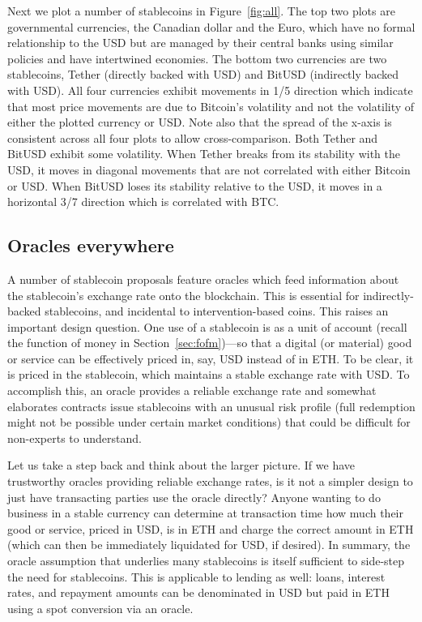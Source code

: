 Next we plot a number of stablecoins in Figure~\ref{fig:all}. The top two plots are governmental currencies, the Canadian dollar and the Euro, which have no formal relationship to the USD but are managed by their central banks using similar policies and have intertwined economies. The bottom two currencies are two stablecoins, Tether (directly backed with USD) and BitUSD (indirectly backed with USD). All four currencies exhibit movements in 1/5 direction which indicate that most price movements are due to Bitcoin's volatility and not the volatility of either the plotted currency or USD. Note also that the spread of the x-axis is consistent across all four plots to allow cross-comparison. Both Tether and BitUSD exhibit some volatility. When Tether breaks from its stability with the USD, it moves in diagonal movements that are not correlated with either Bitcoin or USD. When BitUSD loses its stability relative to the USD, it moves in a horizontal 3/7 direction which is correlated with BTC.



\subsection{Oracles everywhere}


A number of stablecoin proposals feature oracles which feed information about the stablecoin's exchange rate onto the blockchain. This is essential for indirectly-backed stablecoins, and incidental to intervention-based coins. This raises an important design question. One use of a stablecoin is as a unit of account (recall the function of money in Section~\ref{sec:fofm})---so that a digital (or material) good or service can be effectively priced in, say, USD instead of in ETH. To be clear, it is priced in the stablecoin, which maintains a stable exchange rate with USD. To accomplish this, an oracle provides a reliable exchange rate and somewhat elaborates contracts issue stablecoins with an unusual risk profile (\eg full redemption might not be possible under certain market conditions) that could be difficult for non-experts to understand.

Let us take a step back and think about the larger picture. If we have trustworthy oracles providing reliable exchange rates, is it not a simpler design to just have transacting parties use the oracle directly? Anyone wanting to do business in a stable currency can determine at transaction time how much their good or service, priced in USD, is in ETH and charge the correct amount in ETH (which can then be immediately liquidated for USD, if desired). In summary, the oracle assumption that underlies many stablecoins is itself sufficient to side-step the need for stablecoins. This is applicable to lending as well: loans, interest rates, and repayment amounts can be denominated in USD but paid in ETH using a spot conversion via an oracle.

